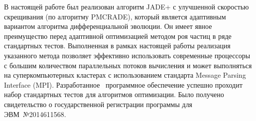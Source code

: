 
В настоящей работе был реализован алгоритм JADE+ с улучшенной
скоростью скрещивания (по алгоритму PMCRADE), который является
адаптивным вариантом алгоритма дифференциальной эволюции. Он имеет
явное преимущество перед адаптивной оптимизацией методом роя частиц в
ряде стандартных тестов.  Выполненная в рамках настоящей работы
реализация указанного метода позволяет эффективно использовать
современные процессоры с большим количеством параллельных потоков
вычисления и может выполняться на суперкомпьютерных кластерах с
использованием стандарта Message Parsing Interface (MPI).
Разработанное~\cite{JADE-web} программное обеспечение успешно проходит
набор стандартных тестов для алгоритмов оптимизации.  Было получено
свидетельство о государственной регистрации программы для
ЭВМ~№2014611568.


